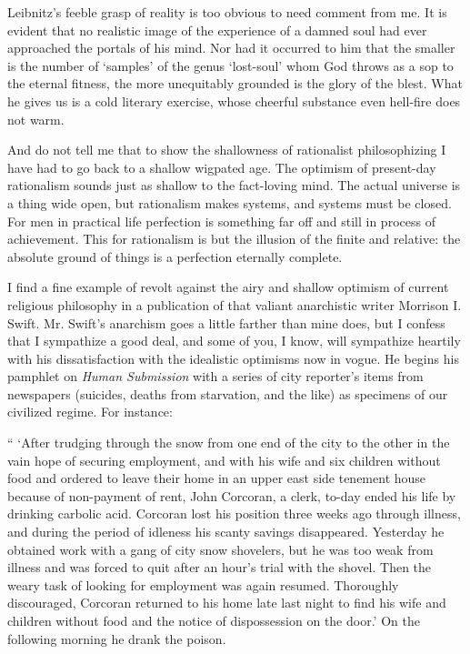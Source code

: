\documentclass[]{article}
\begin{document}
Leibnitz's feeble grasp of reality is too obvious to need comment from
me. It is evident that no realistic image of the experience of a damned
soul had ever approached the portals of his mind. Nor had it occurred to
him that the smaller is the number of `samples' of the genus `lost-soul'
whom God throws as a sop to the eternal fitness, the more unequitably
grounded is the glory of the blest. What he gives us is a cold literary
exercise, whose cheerful substance even hell-fire does not warm.

And do not tell me that to show the shallowness of rationalist
philosophizing I have had to go back to a shallow wigpated age. The
optimism of present-day rationalism sounds just as shallow to the
fact-loving mind. The actual universe is a thing wide open, but
rationalism makes systems, and systems must be closed. For men in
practical life perfection is something far off and still in process of
achievement. This for rationalism is but the illusion of the finite
and relative: the absolute ground of things is a perfection eternally
complete.

I find a fine example of revolt against the airy and shallow optimism
of current religious philosophy in a publication of that valiant
anarchistic writer Morrison I. Swift. Mr. Swift's anarchism goes a
little farther than mine does, but I confess that I sympathize a
good deal, and some of you, I know, will sympathize heartily with his
dissatisfaction with the idealistic optimisms now in vogue. He begins
his pamphlet on \emph{Human Submission} with a series of city reporter's
items from newspapers (suicides, deaths from starvation, and the like) as
specimens of our civilized regime. For instance:

`` `After trudging through the snow from one end of the city to the other
in the vain hope of securing employment, and with his wife and six
children without food and ordered to leave their home in an upper east
side tenement house because of non-payment of rent, John Corcoran, a
clerk, to-day ended his life by drinking carbolic acid. Corcoran lost
his position three weeks ago through illness, and during the period of
idleness his scanty savings disappeared. Yesterday he obtained work with
a gang of city snow shovelers, but he was too weak from illness and was
forced to quit after an hour's trial with the shovel. Then the
weary task of looking for employment was again resumed. Thoroughly
discouraged, Corcoran returned to his home late last night to find his
wife and children without food and the notice of dispossession on the
door.' On the following morning he drank the poison.
\end{document}
